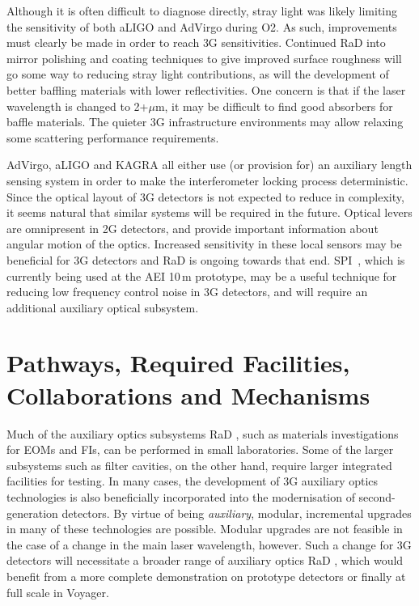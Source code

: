 Although it is often difficult to diagnose directly, stray light was likely limiting the sensitivity of both \ac{aLIGO}  and AdVirgo during O2. As such, improvements must clearly be made in order to reach \ac{3G}   sensitivities. 
Continued \ac{RaD}  into mirror polishing and coating techniques to give improved surface roughness will go some way to reducing stray light contributions, as will the development of better baffling materials with lower reflectivities. One concern is that if the laser wavelength is changed to 2+$\mu$m, it may be difficult to find good absorbers for baffle materials. The quieter \ac{3G}   infrastructure environments may allow relaxing some scattering performance requirements.

AdVirgo, \ac{aLIGO}  and \ac{KAGRA}  all either use (or provision for) an auxiliary length sensing system in order to make the interferometer locking process deterministic. Since the optical layout of \ac{3G}   detectors is not expected to reduce in complexity, it seems natural that similar systems will be required in the future. Optical levers are omnipresent in \ac{2G}  detectors, and provide important information about angular motion of the optics. Increased sensitivity in these local sensors may be beneficial for \ac{3G}   detectors
and \ac{RaD}  is ongoing towards that end. \Ac{SPI}~\cite{SPI}, which is currently being used at the \ac{AEI} 10\,m prototype, may be a useful technique for reducing low frequency control noise in \ac{3G}   detectors, and will require an additional auxiliary optical subsystem.

\section{Pathways, Required Facilities, Collaborations and Mechanisms}

Much of the auxiliary optics subsystems \ac{RaD} , such as materials investigations for \acp{EOM} and \acp{FI}, can be performed in small laboratories. 
Some of the larger subsystems such as filter cavities, on the other hand, require larger integrated facilities for testing. In many cases, the development of \ac{3G}   auxiliary optics technologies is also beneficially incorporated into the modernisation of second-generation detectors. By virtue of being \emph{auxiliary}, modular, incremental upgrades in many of these technologies are possible. Modular upgrades are not feasible in the case of a change in the main laser wavelength, however. Such a change for \ac{3G}   detectors will necessitate a broader range of auxiliary optics \ac{RaD} , which would benefit from a more complete demonstration on prototype detectors or finally at full scale in Voyager.

